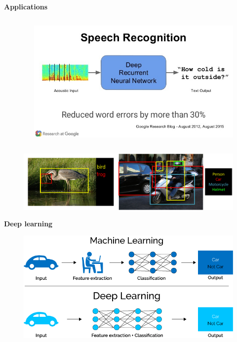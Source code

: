 \documentclass[xcolor=dvipsnames]{beamer}
\begin{document}
\begin{frame}{\bf Applications}
\begin{columns}
\begin{column}{0.33\textwidth}
    \end{column}


    \begin{column}{0.33\textwidth}  %

        \begin{figure}
        \includegraphics[scale=0.15]{../../pictures/speach_recognition.jpg}
        \end{figure}

    \end{column}

\end{columns}


\begin{figure}
\includegraphics[scale=0.2]{../../pictures/image_recognition.png}
\end{figure}


\end{frame}


\begin{frame}{\bf Deep learning \footnotemark}

  \begin{figure}
    \includegraphics[scale=0.4]{../../pictures/end_to_end_learning.png}
  \end{figure}


\end{frame}
\end{document}
